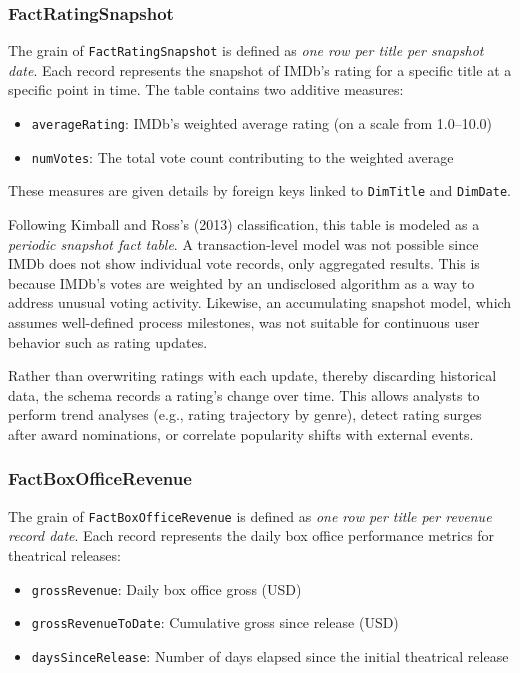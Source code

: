 \subsubsection{FactRatingSnapshot}

The grain of \verb|FactRatingSnapshot| is defined as \textit{one row per title per snapshot date}. Each record represents the snapshot of IMDb's rating for a specific title at a specific point in time. The table contains two additive measures:

\begin{itemize}
    \item \verb|averageRating|: IMDb's weighted average rating (on a scale from 1.0–10.0)
    \item \verb|numVotes|: The total vote count contributing to the weighted average
\end{itemize}

These measures are given details by foreign keys linked to \verb|DimTitle| and \verb|DimDate|.

Following Kimball and Ross’s (2013) classification, this table is modeled as a \textit{periodic snapshot fact table}. A transaction-level model was not possible since IMDb does not show individual vote records, only aggregated results. This is because IMDb's votes are weighted by an undisclosed algorithm as a way to address unusual voting activity. Likewise, an accumulating snapshot model, which assumes well-defined process milestones, was not suitable for continuous user behavior such as rating updates.

Rather than overwriting ratings with each update, thereby discarding historical data, the schema records a rating's change over time. This allows analysts to perform trend analyses (e.g., rating trajectory by genre), detect rating surges after award nominations, or correlate popularity shifts with external events.

\subsubsection{FactBoxOfficeRevenue}

The grain of \verb|FactBoxOfficeRevenue| is defined as \textit{one row per title per revenue record date}. Each record represents the daily box office performance metrics for theatrical releases:

\begin{itemize}
    \item \verb|grossRevenue|: Daily box office gross (USD)
    \item \verb|grossRevenueToDate|: Cumulative gross since release (USD)
    \item \verb|daysSinceRelease|: Number of days elapsed since the initial theatrical release
\end{itemize}

